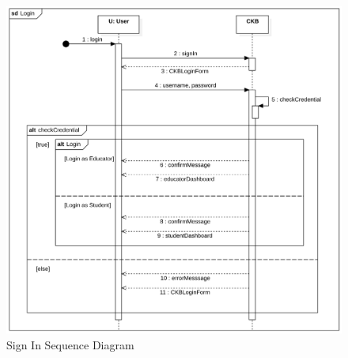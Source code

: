 \begin{figure}[h]
    \centering
    \includegraphics[scale=0.6]{images/SD/LoginSD.png}
    \caption{Sign In Sequence Diagram}
    \label{fig_SignInSD}
\end{figure}



